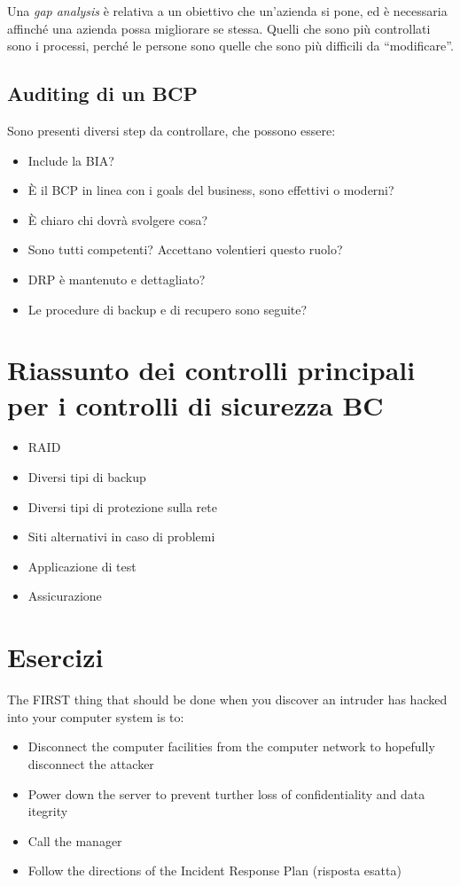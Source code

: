 Una \textit{gap analysis} è relativa a un obiettivo che un'azienda si pone, ed 
è necessaria affinché una azienda possa migliorare se stessa. Quelli che sono 
più controllati sono i processi, perché le persone sono quelle che sono più 
difficili da ``modificare''.

\subsection{Auditing di un BCP}

Sono presenti diversi step da controllare, che possono essere:
\begin{itemize}
  \item Include la BIA?
  \item È il BCP in linea con i goals del business, sono effettivi o moderni?
  \item È chiaro chi dovrà svolgere cosa?
  \item Sono tutti competenti? Accettano volentieri questo ruolo?
  \item DRP è mantenuto e dettagliato?
  \item Le procedure di backup e di recupero sono seguite?
\end{itemize}


\section{Riassunto dei controlli principali per i controlli di sicurezza BC}

\begin{itemize}
  \item RAID
  \item Diversi tipi di backup
  \item Diversi tipi di protezione sulla rete
  \item Siti alternativi in caso di problemi
  \item Applicazione di test
  \item Assicurazione
\end{itemize}

\section{Esercizi}

The FIRST thing that should be done when you discover an intruder has hacked 
into your computer system is to:
\begin{itemize}
  \item Disconnect the computer facilities from the computer network to 
  hopefully disconnect the attacker
  \item Power down the server to prevent turther loss of confidentiality and 
  data itegrity
  \item Call the manager
  \item Follow the directions of the Incident Response Plan (risposta esatta)
\end{itemize}

